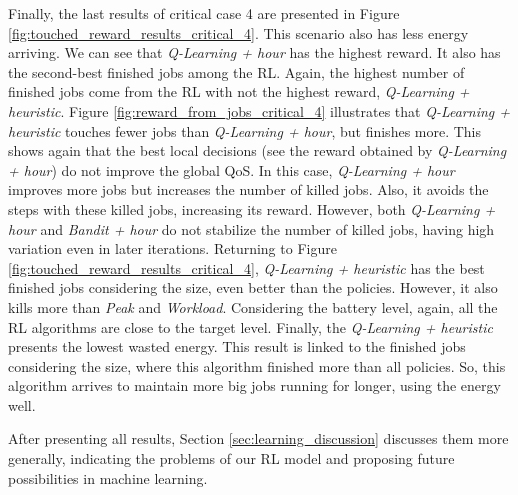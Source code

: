 Finally, the last results of critical case 4 are presented in Figure \ref{fig:touched_reward_results_critical_4}. This scenario also has less energy arriving. We can see that \emph{Q-Learning + hour} has the highest reward. It also has the second-best finished jobs among the RL. Again, the highest number of finished jobs come from the RL with not the highest reward, \emph{Q-Learning + heuristic}. Figure \ref{fig:reward_from_jobs_critical_4} illustrates that \emph{Q-Learning + heuristic} touches fewer jobs than \emph{Q-Learning + hour}, but finishes more. This shows again that the best local decisions (see the reward obtained by \emph{Q-Learning + hour}) do not improve the global QoS. In this case, \emph{Q-Learning + hour} improves more jobs but increases the number of killed jobs. Also, it avoids the steps with these killed jobs, increasing its reward. However, both \emph{Q-Learning + hour} and \emph{Bandit + hour} do not stabilize the number of killed jobs, having high variation even in later iterations. Returning to Figure \ref{fig:touched_reward_results_critical_4}, \emph{Q-Learning + heuristic} has the best finished jobs considering the size, even better than the policies. However, it also kills more than \emph{Peak} and \emph{Workload}. Considering the battery level, again, all the RL algorithms are close to the target level. Finally, the \emph{Q-Learning + heuristic} presents the lowest wasted energy. This result is linked to the finished jobs considering the size, where this algorithm finished more than all policies. So, this algorithm arrives to maintain more big jobs running for longer, using the energy well.

After presenting all results, Section \ref{sec:learning_discussion} discusses them more generally, indicating the problems of our RL model and proposing future possibilities in machine learning.





